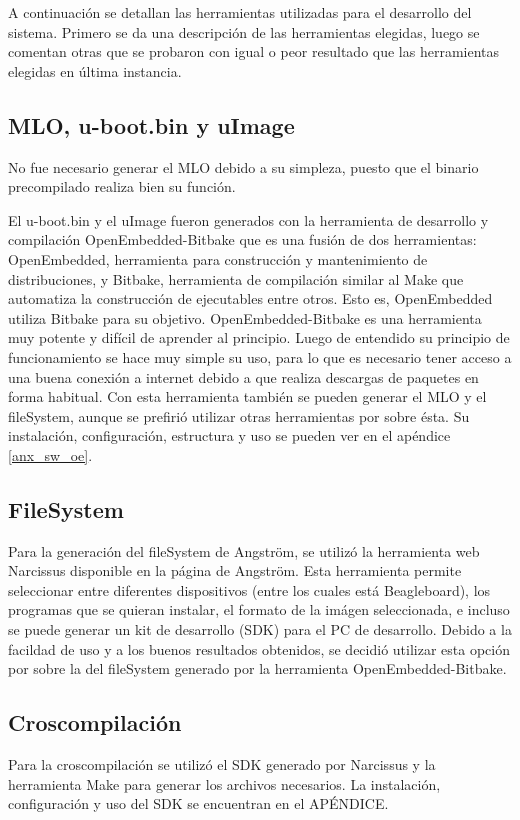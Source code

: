 \bigskip
A continuación se detallan las herramientas utilizadas para el desarrollo del sistema. 
Primero se da una descripción de las herramientas elegidas, luego se comentan otras que se probaron con igual o peor resultado que las herramientas elegidas en última instancia.

\subsection{MLO, u-boot.bin y uImage}
No fue necesario generar el MLO debido a su simpleza, puesto que el binario precompilado realiza bien su función.

El u-boot.bin y el uImage fueron generados con la herramienta de desarrollo y compilación OpenEmbedded-Bitbake \cite{OE-Bb} que es una fusión de dos herramientas: OpenEmbedded, herramienta para construcción y mantenimiento de distribuciones, y Bitbake, herramienta de compilación similar al Make que automatiza la construcción de ejecutables entre otros. Esto es, OpenEmbedded utiliza Bitbake para su objetivo. OpenEmbedded-Bitbake es una herramienta muy potente y difícil de aprender al principio. Luego de entendido su principio de funcionamiento se hace muy simple su uso, para lo que es necesario tener acceso a una buena conexión a internet debido a que realiza descargas de paquetes en forma habitual.
Con esta herramienta también se pueden generar el MLO y el fileSystem, aunque se prefirió utilizar otras herramientas por sobre ésta. 
Su instalación, configuración, estructura y uso se pueden ver en el apéndice \ref{anx_sw_oe}.

\subsection{FileSystem}
Para la generación del fileSystem de Angström, se utilizó la herramienta web Narcissus \cite{Narc} disponible en la página de Angström.
Esta herramienta permite seleccionar entre diferentes dispositivos (entre los cuales está Beagleboard), los programas que se quieran instalar, el formato de la imágen seleccionada, e incluso se puede generar un kit de desarrollo (SDK) para el PC de desarrollo. Debido a la facildad de uso y a los buenos resultados obtenidos, se decidió utilizar esta opción por sobre la del fileSystem generado por la herramienta OpenEmbedded-Bitbake.

\subsection{Croscompilación}
Para la croscompilación se utilizó el SDK generado por Narcissus y la herramienta Make para generar los archivos necesarios. La instalación, configuración y uso del SDK se encuentran en el APÉNDICE.

